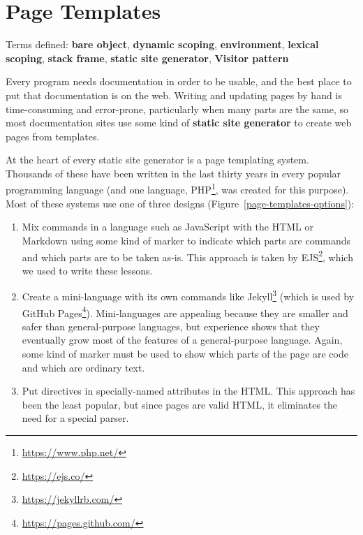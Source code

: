 \documentclass[krantzl]{krantz}
\newcommand{\figref}[1]{Figure~\ref{#1}}
\newcommand{\glossref}[1]{\textbf{#1}}
\newcommand{\hreffoot}[2]{{#1}\footnote{\href{#2}{#2}}}
\begin{document}
\chapter{Page Templates}\label{page-templates}


\noindent 
  Terms defined: \glossref{bare object}, \glossref{dynamic scoping}, \glossref{environment}, \glossref{lexical scoping}, \glossref{stack frame}, \glossref{static site generator}, \glossref{Visitor pattern}



Every program needs documentation in order to be usable,
and the best place to put that documentation is on the web.
Writing and updating pages by hand is time-consuming and error-prone,
particularly when many parts are the same,
so most documentation sites use some kind of
\glossref{static site generator}
to create web pages from templates.


At the heart of every static site generator is a page templating system.
Thousands of these have been written in the last thirty years
in every popular programming language
(and one language, \hreffoot{PHP}{https://www.php.net/}, was created for this purpose).
Most of these systems use one of three designs
(\figref{page-templates-options}):

\begin{enumerate}

\item 

Mix commands in a language such as JavaScript with the HTML or Markdown
    using some kind of marker to indicate which parts are commands
    and which parts are to be taken as-is.
    This approach is taken by \hreffoot{EJS}{https://ejs.co/},
    which we used to write these lessons.



\item 

Create a mini-language with its own commands like \hreffoot{Jekyll}{https://jekyllrb.com/}
    (which is used by \hreffoot{GitHub Pages}{https://pages.github.com/}).
    Mini-languages are appealing because they are smaller and safer than general-purpose languages,
    but experience shows that they eventually grow
    most of the features of a general-purpose language.
    Again, some kind of marker must be used to show
    which parts of the page are code and which are ordinary text.



\item 

Put directives in specially-named attributes in the HTML.
    This approach has been the least popular,
    but since pages are valid HTML,
    it eliminates the need for a special parser.



\end{enumerate}
\end{document}
